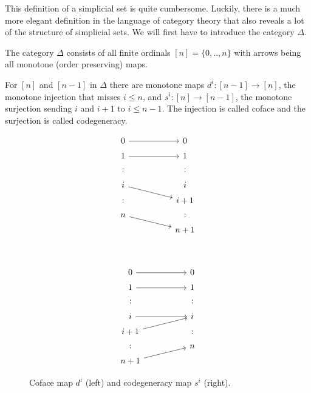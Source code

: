 \documentclass[../../main.tex]{subfiles}
\begin{document}
    This definition of a simplicial set is quite cumbersome. Luckily, there is a much more elegant definition in the language of category theory that also reveals a lot of the structure of simplicial sets. We will first have to introduce the category $\Delta$.

    \begin{definition}
        The category $\Delta$ consists of all finite ordinals $[n] = \{0, .., n\}$ with arrows being all monotone (order preserving) maps.
    \end{definition}

    For $[n]$ and $[n-1]$ in $\Delta$ there are monotone maps $d^i: [n-1] \to [n]$, the monotone injection that misses $i \leq n$, and $s^i: [n] \to [n-1]$, the monotone surjection sending $i$ and $i+1$ to $i \leq n-1$. The injection is called coface and the surjection is called codegeneracy. 

    \begin{figure}[H]
        \begin{subfigure}[b]{0.45\textwidth}
            \[
                \begin{tikzcd}[row sep = 1ex, column sep = 5em]
                    0  \arrow[r] &  0 \\
                    1  \arrow[r] &  1 \\
                    : & : \\
                    i \arrow[dr] & i\\
                    : & i+1\\
                    n \arrow[dr] & :\\
                    & n+1
                \end{tikzcd}
          \]
        \end{subfigure}
        ~
        \begin{subfigure}[b]{0.45\textwidth}
            \[
                \begin{tikzcd}[row sep = 1ex, column sep = 5em]
                    0  \arrow[r] &  0 \\
                    1  \arrow[r] &  1 \\
                    : & : \\
                    i \arrow[r] &  i\\
                    i + 1 \arrow[ur] & :\\
                    : & n\\
                    n + 1 \arrow[ur] 
                \end{tikzcd}
          \]
        \end{subfigure}
        \caption{Coface map $d^i$ (left) and codegeneracy map $s^i$ (right).}
    \end{figure}
    
\end{document}
